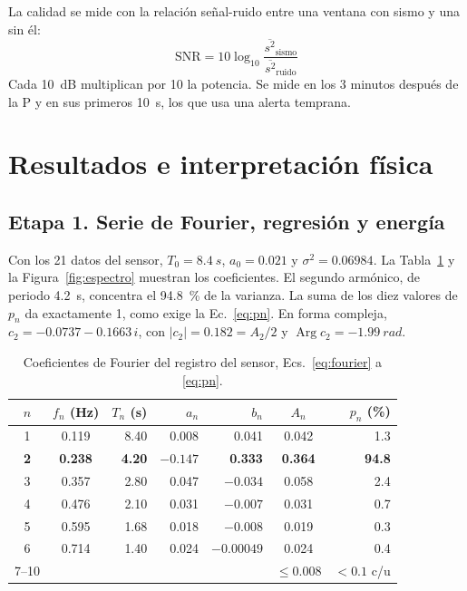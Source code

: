 \documentclass[11pt,letterpaper]{article}
\begin{document}
La calidad se mide con la relación señal-ruido entre una ventana con sismo y una sin él:
\begin{equation}
\mathrm{SNR} = 10\log_{10}\frac{\overline{s^2}_{\text{sismo}}}{\overline{s^2}_{\text{ruido}}}
\label{eq:snr}
\end{equation}
Cada \SI{10}{dB} multiplican por 10 la potencia. Se mide en los 3 minutos después de la P y en sus primeros \SI{10}{s}, los que usa una alerta temprana.

\section{Resultados e interpretación física}

\subsection{Etapa 1. Serie de Fourier, regresión y energía}
Con los 21 datos del sensor, $T_0 = \SI{8.4}{s}$, $a_0 = 0.021$ y $\sigma^2 = 0.06984$. La Tabla~\ref{tab:fourier} y la Figura~\ref{fig:espectro} muestran los coeficientes. El segundo armónico, de periodo \SI{4.2}{s}, concentra el \SI{94.8}{\percent} de la varianza. La suma de los diez valores de $p_n$ da exactamente 1, como exige la Ec.~\eqref{eq:pn}. En forma compleja, $c_2 = -0.0737 - 0.1663\,i$, con $|c_2| = 0.182 = A_2/2$ y $\operatorname{Arg}c_2 = \SI{-1.99}{rad}$.

\begin{table}[H]
\centering
\small
\begin{tabular}{ccrrrcr}
\toprule
$n$ & $f_n$ (Hz) & $T_n$ (s) & $a_n$ & $b_n$ & $A_n$ & $p_n$ (\%)\\
\midrule
1 & 0.119 & 8.40 & 0.008 & 0.041 & 0.042 & 1.3\\
\textbf{2} & \textbf{0.238} & \textbf{4.20} & $\mathbf{-0.147}$ & \textbf{0.333} & \textbf{0.364} & \textbf{94.8}\\
3 & 0.357 & 2.80 & 0.047 & $-0.034$ & 0.058 & 2.4\\
4 & 0.476 & 2.10 & 0.031 & $-0.007$ & 0.031 & 0.7\\
5 & 0.595 & 1.68 & 0.018 & $-0.008$ & 0.019 & 0.3\\
6 & 0.714 & 1.40 & 0.024 & $-0.00049$ & 0.024 & 0.4\\
7--10 & & & & & $\leq 0.008$ & $< 0.1$ c/u\\
\bottomrule
\end{tabular}
\caption{Coeficientes de Fourier del registro del sensor, Ecs.~\eqref{eq:fourier} a \eqref{eq:pn}.}
\label{tab:fourier}
\end{table}
\end{document}
